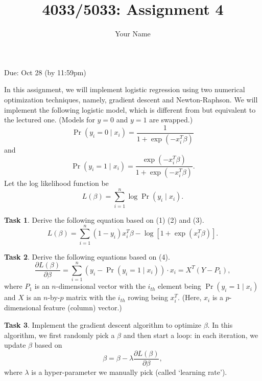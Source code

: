 \documentclass{llncs}
\title{4033/5033: Assignment 4}
\author{Your Name}
\institute{}
\begin{document}
\maketitle 

\setlength\parindent{0pt} 
\setlength{\parskip}{10pt}

Due: Oct 28 (by 11:59pm)

In this assignment, we will implement logistic regression 
using two numerical optimization techniques, namely, 
gradient descent and Newton-Raphson. 
We will implement the following logistic model, which is different 
from but equivalent to the lectured one. (Models for $y=0$ 
and $y=1$ are swapped.) 
\begin{equation}
\Pr(y_i = 0 \mid x_i) = \frac{1}{1 + \exp(-x_i^T \beta)}    
\end{equation}
and 
\begin{equation}
\Pr(y_i = 1 \mid x_i) = \frac{\exp(-x_i^T \beta)}{1 + \exp(-x_i^T \beta)}.    
\end{equation}
Let the log likelihood function be 
\begin{equation}
L(\beta) = \sum_{i=1}^n \log \Pr(y_i \mid x_i).    
\end{equation}

\textbf{Task 1}. Derive the following equation 
based on (1) (2) and (3). 
\begin{equation}
L(\beta) = \sum_{i=1}^n (1-y_i) x_i^T \beta - 
\log [1 + \exp(x_i^T \beta)]. 
\end{equation}

\textbf{Task 2}. 
Derive the following equations based on (4). 
\begin{equation}
\label{t2:1d}
\frac{\partial L(\beta)}{\partial \beta}
= \sum_{i=1}^n (y_i - \Pr(y_i = 1 \mid x_i)) \cdot x_i 
= X^T (Y - P_1),  
\end{equation}
where $P_{1}$ is an $n$-dimensional vector with the 
$i_{th}$ element being $\Pr(y_i = 1 \mid x_i)$ and $X$ 
is an $n$-by-$p$ matrix with the $i_{th}$ rowing being 
$x_i^T$. (Here, $x_i$ is a $p$-dimensional feature 
(column) vector.) 

\textbf{Task 3}. Implement the gradient descent algorithm 
to optimize $\beta$. In this algorithm, we first 
randomly pick a $\beta$ and then start a loop: in 
each iteration, we update $\beta$ based on 
\begin{equation}
\beta = \beta - \lambda \frac{\partial 
L(\beta)}{\partial \beta},      
\end{equation}
where $\lambda$ is a hyper-parameter we manually pick 
(called `learning rate'). 
\end{document}
